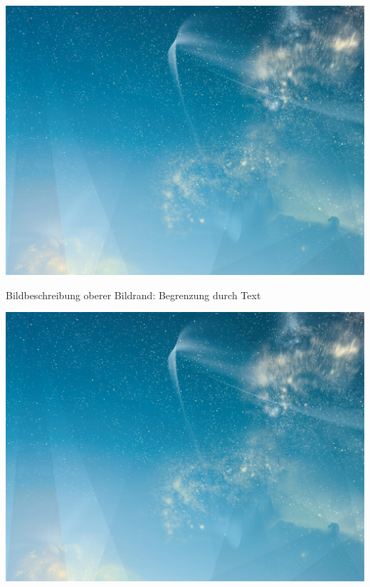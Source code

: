 \begin{frame}
\begin{frame}
\includegraphics[width=\textwidth, height=.55\textheight]{./Resources/Images/SternenhimmelQuer.jpg}%

\end{frame}
\clearpage

\begin{frame}

    Bildbeschreibung\newline
    oberer Bildrand: Begrenzung durch Text

\vspace*{-3mm}
\begin{minipage}[t][0cm]{\paperwidth}%
\hspace*{-\PraesentationSeitenrand}%
\includegraphics[width=\paperwidth]{./Resources/Images/SternenhimmelQuer.jpg}
\end{minipage}
    

\end{frame}
\end{frame}
